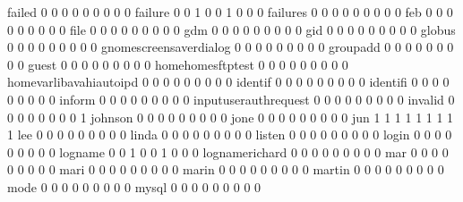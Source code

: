 \documentclass[compress,8pt]{beamer}
\begin{document}
\begin{frame}
\begin{Schunk}
  failed                                     0   0   0   0   0   0   0   0   0
  failure                                    0   0   1   0   0   1   0   0   0
  failures                                   0   0   0   0   0   0   0   0   0
  feb                                        0   0   0   0   0   0   0   0   0
  file                                       0   0   0   0   0   0   0   0   0
  gdm                                        0   0   0   0   0   0   0   0   0
  gid                                        0   0   0   0   0   0   0   0   0
  globus                                     0   0   0   0   0   0   0   0   0
  gnomescreensaverdialog                     0   0   0   0   0   0   0   0   0
  groupadd                                   0   0   0   0   0   0   0   0   0
  guest                                      0   0   0   0   0   0   0   0   0
  homehomesftptest                           0   0   0   0   0   0   0   0   0
  homevarlibavahiautoipd                     0   0   0   0   0   0   0   0   0
  identif                                    0   0   0   0   0   0   0   0   0
  identifi                                   0   0   0   0   0   0   0   0   0
  inform                                     0   0   0   0   0   0   0   0   0
  inputuserauthrequest                       0   0   0   0   0   0   0   0   0
  invalid                                    0   0   0   0   0   0   0   0   1
  johnson                                    0   0   0   0   0   0   0   0   0
  jone                                       0   0   0   0   0   0   0   0   0
  jun                                        1   1   1   1   1   1   1   1   1
  lee                                        0   0   0   0   0   0   0   0   0
  linda                                      0   0   0   0   0   0   0   0   0
  listen                                     0   0   0   0   0   0   0   0   0
  login                                      0   0   0   0   0   0   0   0   0
  logname                                    0   0   1   0   0   1   0   0   0
  lognamerichard                             0   0   0   0   0   0   0   0   0
  mar                                        0   0   0   0   0   0   0   0   0
  mari                                       0   0   0   0   0   0   0   0   0
  marin                                      0   0   0   0   0   0   0   0   0
  martin                                     0   0   0   0   0   0   0   0   0
  mode                                       0   0   0   0   0   0   0   0   0
  mysql                                      0   0   0   0   0   0   0   0   0

\end{Schunk}
\end{frame}
\end{document}
